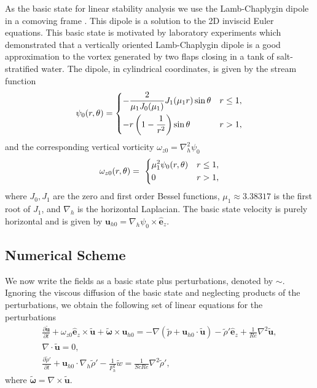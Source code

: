 As the basic state for linear stability analysis we use the Lamb-Chaplygin dipole in a comoving frame \cite{meleshko1994}. This dipole is a solution to the 2D inviscid Euler equations. This basic state is motivated by laboratory experiments \cite{bc2000a,leweke1998} which demonstrated that a vertically oriented Lamb-Chaplygin dipole is a good approximation to the vortex generated by two flaps closing in a tank of salt-stratified water. The dipole, in cylindrical coordinates, is given by the stream function
\begin{align}
\psi_{0}(r,\theta) = 
\begin{dcases}
-\frac{2}{\mu_{1}J_{0}(\mu_{1})}J_{1}(\mu_{1}r)\sin\theta & r\le 1,\\
-r\left(1-\frac{1}{r^{2}}\right)\sin\theta & r>1 ,
\end{dcases}
\end{align}
and the corresponding vertical vorticity $\omega_{z0}=\nabla_{h}^{2}\psi_{0}$
\begin{align}
\omega_{z0}(r,\theta) = \
\begin{dcases}
\mu_{1}^{2}\psi_{0}(r,\theta) & r\le 1,\\
0 & r>1,
\end{dcases}
\end{align}
where $J_{0},J_{1}$ are the zero and first order Bessel functions, $\mu_{1}\approx 3.38317$ is the first root of $J_{1}$, and $\nabla_{h}$ is the horizontal Laplacian. The basic state velocity is purely horizontal and is given by $\bm{u}_{h0}=\nabla_{h}\psi_{0}\times\hat{\bm{e}}_{z}$.

\subsection{Numerical Scheme}
We now write the fields as a basic state plus perturbations, denoted by $\sim$. Ignoring the viscous diffusion of the basic state \cite{drazinreid} and neglecting products of the perturbations, we obtain the following set of linear equations for the perturbations
\begin{align}
\frac{\partial \tilde{\bm{u}}}{\partial t} + \omega_{z0}\hat{\bm{e}}_{z}\times \tilde{\bm{u}}+\tilde{\boldsymbol{\omega}}\times \bm{u}_{h0} = -\nabla(\tilde{p}+\bm{u}_{h0} \cdot \tilde{\bm{u}}) - \tilde{\rho}'\hat{\bm{e}}_{z} + \frac{1}{Re}\nabla^{2}\tilde{\bm{u}},\label{nsl1}\\
\nabla\cdot\tilde{\bm{u}}=0,\\
\frac{\partial \tilde{\rho}'}{\partial t} + \bm{u}_{h0}\cdot \nabla_{h}\tilde{\rho}'-\frac{1}{F_{h}^{2}}\tilde{w} = \frac{1}{ScRe}\nabla^{2}\tilde{\rho}',\label{nsl3}
\end{align}
where $\tilde{\boldsymbol{\omega}}=\nabla \times \tilde{\bm{u}}$.

